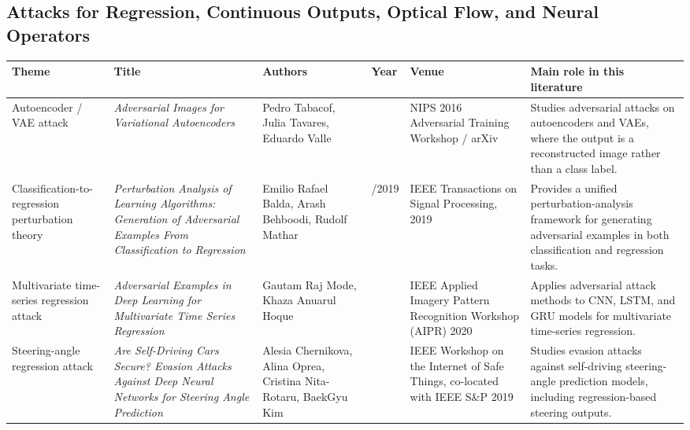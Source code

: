 \documentclass{article}
\begin{document}
\subsection{Attacks for Regression, Continuous Outputs, Optical Flow, and Neural Operators}

\begin{landscape}
\begin{table}[p]
\centering
\footnotesize
\begin{tabular}{>{\raggedright\arraybackslash}p{2.4cm} >{\raggedright\arraybackslash}p{4.0cm} >{\raggedright\arraybackslash}p{3.4cm} >{\raggedright\arraybackslash}p{1.0cm} >{\raggedright\arraybackslash}p{3.2cm} >{\raggedright\arraybackslash}p{6.2cm}}
\hline
\textbf{Theme} & \textbf{Title} & \textbf{Authors} & \textbf{Year} & \textbf{Venue} & \textbf{Main role in this literature} \\
\hline
Autoencoder / VAE attack &
\textit{Adversarial Images for Variational Autoencoders} &
Pedro Tabacof, Julia Tavares, Eduardo Valle &
2016 &
NIPS 2016 Adversarial Training Workshop / arXiv &
Studies adversarial attacks on autoencoders and VAEs, where the output is a reconstructed image rather than a class label. \\
\hline
Classification-to-regression perturbation theory &
\textit{Perturbation Analysis of Learning Algorithms: Generation of Adversarial Examples From Classification to Regression} &
Emilio Rafael Balda, Arash Behboodi, Rudolf Mathar &
2018/2019 &
IEEE Transactions on Signal Processing, 2019 &
Provides a unified perturbation-analysis framework for generating adversarial examples in both classification and regression tasks. \\
\hline
Multivariate time-series regression attack &
\textit{Adversarial Examples in Deep Learning for Multivariate Time Series Regression} &
Gautam Raj Mode, Khaza Anuarul Hoque &
2020 &
IEEE Applied Imagery Pattern Recognition Workshop (AIPR) 2020 &
Applies adversarial attack methods to CNN, LSTM, and GRU models for multivariate time-series regression. \\
\hline
Steering-angle regression attack &
\textit{Are Self-Driving Cars Secure? Evasion Attacks Against Deep Neural Networks for Steering Angle Prediction} &
Alesia Chernikova, Alina Oprea, Cristina Nita-Rotaru, BaekGyu Kim &
2019 &
IEEE Workshop on the Internet of Safe Things, co-located with IEEE S\&P 2019 &
Studies evasion attacks against self-driving steering-angle prediction models, including regression-based steering outputs. \\

\end{tabular}
\end{table}
\end{landscape}
\end{document}
